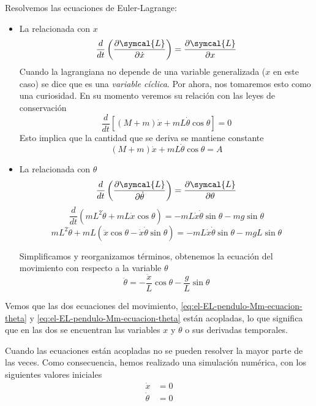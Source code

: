 Resolvemos las ecuaciones de Euler-Lagrange:
\begin{itemize}
\item La relacionada con $x$
  \[
    \frac{d}{dt}\left(\frac{\partial\symcal{L}}{\partial\dot{x}}\right)
    = \frac{\partial\symcal{L}}{\partial x}
  \]
  Cuando la lagrangiana no depende de una variable generalizada ($x$ en este caso)
  se dice que es una \emph{variable cíclica}.
  Por ahora, nos tomaremos esto como una curiosidad. En su momento veremos su relación
  con las leyes de conservación
  \[
    \frac{d}{dt}\left[(M+m)\dot{x}+mL\dot{\theta}\cos\theta\right] = 0
  \]
  Esto implica que la cantidad que se deriva se mantiene constante
  \begin{equation}\label{eq:el-EL-pendulo-Mm-ecuacion-x}
    (M+m)\dot{x}+mL\dot{\theta}\cos\theta = A
  \end{equation}
  
\item La relacionada con $\theta$
  \[
    \frac{d}{dt}\left(\frac{\partial\symcal{L}}{\partial\dot{\theta}}\right)
    = \frac{\partial\symcal{L}}{\partial\theta}
  \]
  \[
    \frac{d}{dt}\left(mL^2\dot{\theta} + mL\dot{x}\cos\theta\right)
    = -mL\dot{x}\dot{\theta}\sin\theta-mg\sin\theta
  \]
  \[
    mL^2\ddot{\theta} + mL\left(\ddot{x}\cos\theta - \dot{x}\dot{\theta}\sin\theta\right)
    = -mL\dot{x}\dot{\theta}\sin\theta-mgL\sin\theta
  \]

  Simplificamos y reorganizamos términos, obtenemos la ecuación del movimiento con respecto a la
  variable $\theta$
  \begin{equation}\label{eq:el-EL-pendulo-Mm-ecuacion-theta}
    \ddot{\theta} = -\frac{\ddot{x}}{L}\cos\theta - \frac{g}{L}\sin\theta
  \end{equation}
\end{itemize}

Vemos que las dos ecuaciones del movimiento, \ref{eq:el-EL-pendulo-Mm-ecuacion-theta}
y \ref{eq:el-EL-pendulo-Mm-ecuacion-theta} están acopladas, lo que significa que en
las dos se encuentran las variables $x$ y $\theta$ o sus derivadas temporales.

Cuando las ecuaciones están acopladas no se pueden resolver la mayor parte de las veces.
Como consecuencia, hemos realizado una simulación numérica, con los siguientes
valores iniciales
\begin{align*}
  \dot{x} &= 0\\
  \dot{\theta} &= 0
\end{align*}













